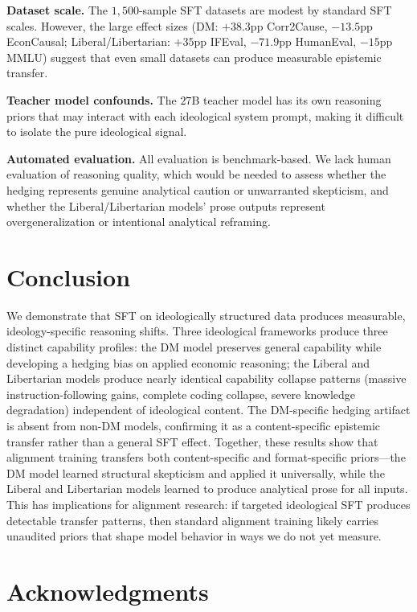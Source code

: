 \documentclass[sigconf]{acmart}
\begin{document}
\textbf{Dataset scale.} The $1{,}500$-sample SFT datasets are modest by standard SFT scales. However, the large effect sizes (DM: $+38.3$pp Corr2Cause, $-13.5$pp EconCausal; Liberal/Libertarian: $+35$pp IFEval, $-71.9$pp HumanEval, $-15$pp MMLU) suggest that even small datasets can produce measurable epistemic transfer.

\textbf{Teacher model confounds.} The $27$B teacher model has its own reasoning priors that may interact with each ideological system prompt, making it difficult to isolate the pure ideological signal.

\textbf{Automated evaluation.} All evaluation is benchmark-based. We lack human evaluation of reasoning quality, which would be needed to assess whether the hedging represents genuine analytical caution or unwarranted skepticism, and whether the Liberal/Libertarian models' prose outputs represent overgeneralization or intentional analytical reframing.

\section{Conclusion}

We demonstrate that SFT on ideologically structured data produces measurable, ideology-specific reasoning shifts. Three ideological frameworks produce three distinct capability profiles: the DM model preserves general capability while developing a hedging bias on applied economic reasoning; the Liberal and Libertarian models produce nearly identical capability collapse patterns (massive instruction-following gains, complete coding collapse, severe knowledge degradation) independent of ideological content. The DM-specific hedging artifact is absent from non-DM models, confirming it as a content-specific epistemic transfer rather than a general SFT effect. Together, these results show that alignment training transfers both content-specific and format-specific priors---the DM model learned structural skepticism and applied it universally, while the Liberal and Libertarian models learned to produce analytical prose for all inputs. This has implications for alignment research: if targeted ideological SFT produces detectable transfer patterns, then standard alignment training likely carries unaudited priors that shape model behavior in ways we do not yet measure.

\section*{Acknowledgments}
\end{document}
